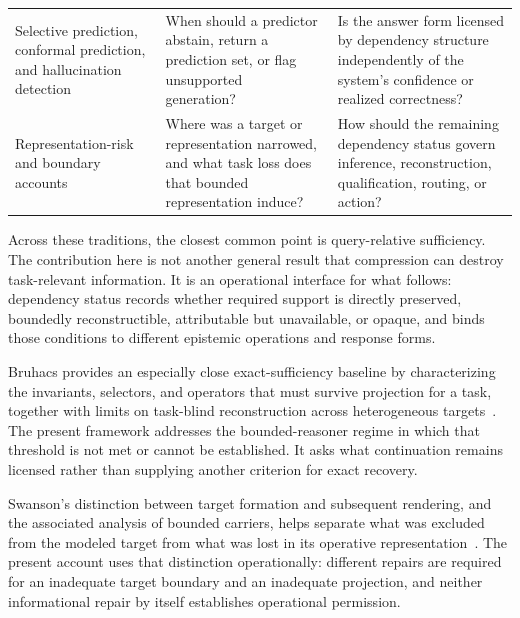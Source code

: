 \documentclass[11pt]{article}
\theoremstyle{definition}
\theoremstyle{remark}
\begin{document}
\begin{table}[p]
\begin{tabular}{
>{\raggedright\arraybackslash}p{}
>{\raggedright\arraybackslash}p{}
>{\raggedright\arraybackslash}p{}}
Selective prediction, conformal prediction, and hallucination detection
&
When should a predictor abstain, return a prediction set, or flag unsupported generation?~\cite{GeifmanElYaniv2017,GeifmanElYaniv2019,Vovk2005,Shafer2008,Ji2023,Manakul2023,Hu2026HARP}
&
Is the answer form licensed by dependency structure independently of the system's confidence or realized correctness?
\\

Representation-risk and boundary accounts
&
Where was a target or representation narrowed, and what task loss does that bounded representation induce?~\cite{Swanson2026Monist,Swanson2026Carriers}
&
How should the remaining dependency status govern inference, reconstruction, qualification, routing, or action?
\\

\bottomrule
\end{tabular}
\end{table}

Across these traditions, the closest common point is query-relative sufficiency. The contribution here is not another general result that compression can destroy task-relevant information. It is an operational interface for what follows: dependency status records whether required support is directly preserved, boundedly reconstructible, attributable but unavailable, or opaque, and binds those conditions to different epistemic operations and response forms.

Bruhacs provides an especially close exact-sufficiency baseline by characterizing the invariants, selectors, and operators that must survive projection for a task, together with limits on task-blind reconstruction across heterogeneous targets~\cite{Bruhacs2026Projection,Bruhacs2026Hidden,Bruhacs2026Limits}. The present framework addresses the bounded-reasoner regime in which that threshold is not met or cannot be established. It asks what continuation remains licensed rather than supplying another criterion for exact recovery.

Swanson's distinction between target formation and subsequent rendering, and the associated analysis of bounded carriers, helps separate what was excluded from the modeled target from what was lost in its operative representation~\cite{Swanson2026Monist,Swanson2026Carriers}. The present account uses that distinction operationally: different repairs are required for an inadequate target boundary and an inadequate projection, and neither informational repair by itself establishes operational permission.
\end{document}
